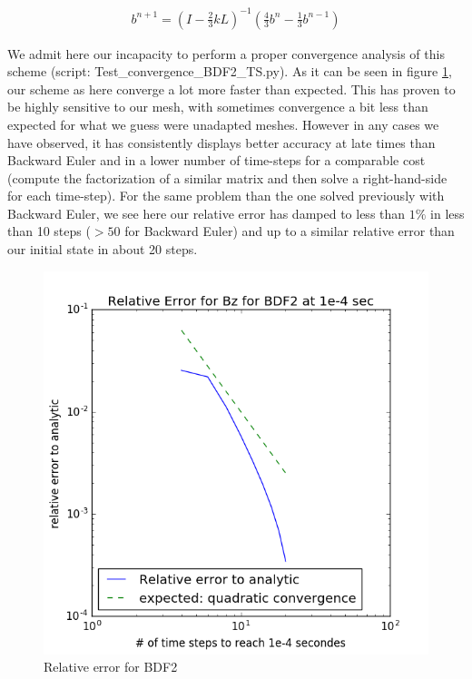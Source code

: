 \documentclass[twoside]{article}
\begin{document}
\begin{align}
b^{n+1}= (I-\frac{2}{3}kL)^{-1}(\frac{4}{3} b^n - \frac{1}{3} b^{n-1})
\end{align}

We admit here our incapacity to perform a proper convergence analysis of this scheme (script: Test\_convergence\_BDF2\_TS.py). As it can be seen in figure \ref{Convergence_BDF2}, our scheme as here converge a lot more faster than expected. This has proven to be highly sensitive to our mesh, with sometimes convergence a bit less than expected for what we guess were unadapted meshes.
However in any cases we have observed, it has consistently displays better accuracy at late times than Backward Euler and in a lower number of time-steps for a comparable cost (compute the factorization of a similar matrix and then solve a right-hand-side for each time-step). For the same problem than the one solved previously with Backward Euler, we see here our relative error has damped to less than $1\%$ in less than 10 steps ($>50$ for Backward Euler) and up to a similar relative error than our initial state in about 20 steps. 

\begin{figure}[!ht]
\centering
\includegraphics[scale=0.4]{./figures/BDF2/RelativeError_BDF2_morethanexpected_2.png}
\caption{Relative error for BDF2}
\label{Convergence_BDF2}
\end{figure}
\end{document}
